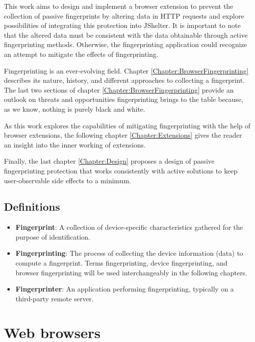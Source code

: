 This work aims to design and implement a browser extension to prevent the collection of passive fingerprints by altering data in HTTP requests and explore possibilities of integrating this protection into JShelter. It is important to note that the altered data must be consistent with the data obtainable through active fingerprinting methods. Otherwise, the fingerprinting application could recognize an attempt to mitigate the effects of fingerprinting.

Fingerprinting is an ever-evolving field. Chapter \ref{Chapter:BrowserFingerprinting} describes its nature, history, and different approaches to collecting a fingerprint. The last two sections of chapter \ref{Chapter:BrowserFingerprinting} provide an outlook on threats and opportunities fingerprinting brings to the table because, as we know, nothing is purely black and white.

As this work explores the capabilities of mitigating fingerprinting with the help of browser extensions, the following chapter \ref{Chapter:Extensions} gives the reader an insight into the inner working of extensions.

Finally, the last chapter \ref{Chapter:Design} proposes a design of passive fingerprinting protection that works consistently with active solutions to keep user-observable side effects to a minimum.

\section{Definitions}

\begin{itemize}
	\item \textbf{Fingerprint}: A collection of device-specific characteristics gathered for the purpose of identification.
	\item \textbf{Fingerprinting}: The process of collecting the device information (data) to compute a fingerprint. Terms fingerprinting, device fingerprinting, and browser fingerprinting will be used interchangeably in the following chapters.
	\item \textbf{Fingerprinter}: An application performing fingerprinting, typically on a third-party remote server.
\end{itemize}


\chapter{Web browsers}

